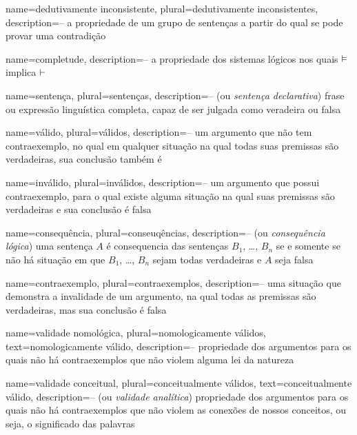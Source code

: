   {    name={dedutivamente inconsistente}, 
       plural={dedutivamente inconsistentes},
    description={-- a propriedade de um grupo de sentenças a partir do qual se pode provar uma contradição}
  }
  
  {
  name=completude,
  description={-- a propriedade dos sistemas lógicos nos quais $\vDash $ implica $\vdash$}
  }
  
  {
  name=sentença,
  plural=sentenças,
  description={-- (ou \textit{sentença declarativa}) frase ou expressão linguística completa, capaz de ser julgada como veradeira ou falsa}
  }
  
  {
  name=válido,
  plural=válidos,
  description={-- um argumento que não tem contraexemplo, no qual em qualquer situação na qual todas suas premissas são verdadeiras, sua conclusão também é}
  }
  
  {
  name=inválido,
  plural=inválidos,
  description={-- um argumento que possui contraexemplo, para o qual existe alguma situação na qual suas premissas são verdadeiras e sua conclusão é falsa}
  }
  
    {
    name=consequência,
    plural=conseuqências,
    description={-- (ou \textit{consequência lógica}) uma sentença $A$ é consequencia das sentenças $B_1$, \dots, $B_n$ se e somente se não há situação em que $B_1$, \dots, $B_n$ sejam todas verdadeiras e $A$ seja falsa}
    }
  
  {
  name=contraexemplo,
  plural=contraexemplos,
  description={-- uma situação que demonstra a invalidade de um argumento, na qual todas as premissas são verdadeiras, mas sua conclusão é falsa}
  }
  
  {
  name=validade nomológica,
  plural=nomologicamente válidos,
  text=nomologicamente válido,
  description={-- propriedade dos argumentos para os quais não há contraexemplos que não violem alguma lei da natureza}
  }
  
  {
  name=validade conceitual,
  plural=conceitualmente válidos,
  text=conceitualmente válido,
  description={-- (ou \textit{validade analítica}) propriedade dos argumentos para os quais não há contraexemplos que não violem as conexões de nossos conceitos, ou seja, o significado das palavras}
  }
  
